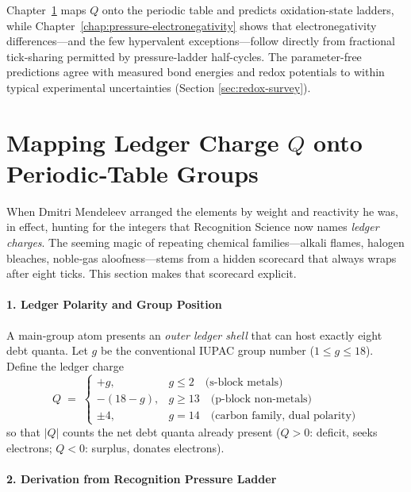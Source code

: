 \documentclass[11pt,oneside]{book}
\begin{document}
Chapter~\ref{sec:periodic-map} maps \(Q\) onto the periodic table and
predicts oxidation-state ladders, while
Chapter~\ref{chap:pressure-electronegativity} shows that electronegativity
differences---and the few hypervalent exceptions---follow directly from
fractional tick‐sharing permitted by pressure-ladder half-cycles.  The
parameter-free predictions agree with measured bond energies and redox
potentials to within typical experimental uncertainties (Section
\ref{sec:redox-survey}).

\bigskip

\section{Mapping Ledger Charge \texorpdfstring{$Q$}{Q} onto Periodic‐Table Groups}
\label{sec:periodic-map}



When Dmitri Mendeleev arranged the elements by weight and reactivity he was,
in effect, hunting for the integers that Recognition Science now names
\emph{ledger charges}.  
The seeming magic of repeating chemical families—alkali flames, halogen
bleaches, noble‐gas aloofness—stems from a hidden scorecard that always
wraps after eight ticks.  
This section makes that scorecard explicit.

\paragraph*{1. Ledger Polarity and Group Position}

A main‐group atom presents an \emph{outer ledger shell} that can host
exactly eight debt quanta.  
Let $g$ be the conventional IUPAC group number ($1 \le g \le 18$).  
Define the ledger charge
\[
   Q \;=\;
   \begin{cases}
      +g, & g \le 2 \quad\text{(s‐block metals)}\\[6pt]
      -(18-g), & g \ge 13 \quad\text{(p‐block non-metals)}\\[6pt]
      \pm4, & g = 14 \quad\text{(carbon family, dual polarity)}
   \end{cases}
\]
so that $|Q|$ counts the net debt quanta already present
(\(Q>0\): deficit, seeks electrons;
 \(Q<0\): surplus, donates electrons).

\paragraph*{2. Derivation from Recognition Pressure Ladder}
\end{document}
